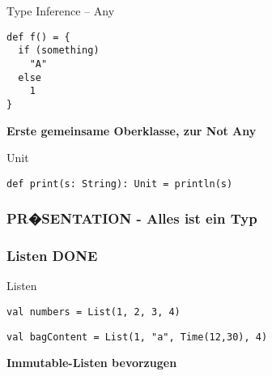 \documentclass[14pt,aspectratio=169,trans]{beamer} %
\begin{document}
\begin{frame}[fragile]{}
 \begin{block}{Type Inference -- Any}
\scriptsize
	\onslide<2->
  \begin{lstlisting}
def f() = {
  if (something)
    "A"
  else
    1
}
	\end{lstlisting}
\end{block}
\textbf{Erste gemeinsame Oberklasse, zur Not Any}
\note{}
\end{frame}

\begin{frame}[fragile]{}
 \begin{block}{Unit}
\scriptsize
	\onslide<2->
  \begin{lstlisting}
def print(s: String): Unit = println(s)
	\end{lstlisting}
\end{block}
\end{frame}



\subsubsection*{PR�SENTATION - Alles ist ein Typ}


\subsubsection*{Listen DONE}

\begin{frame}[fragile]{}
 \begin{block}{Listen}
\scriptsize
	\onslide<2->
  \begin{lstlisting}
val numbers = List(1, 2, 3, 4)

	\end{lstlisting}
  \begin{lstlisting}[firstnumber = 2]
val bagContent = List(1, "a", Time(12,30), 4)
	\end{lstlisting}
\end{block}
\textbf{Immutable-Listen bevorzugen}
\end{frame}
\end{document}
